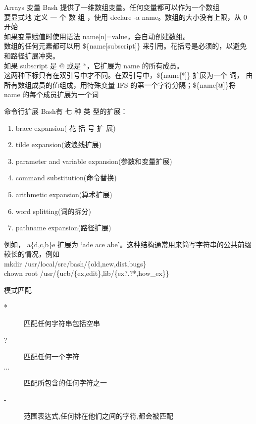 \begin{frame}{Arrays 变量}
Bash  提供了一维数组变量。任何变量都可以作为一个数组 \\
要显式地 定义 一 个 数 组 ，使用 declare -a name。数组的大小没有上限，从 0 开始\\
如果变量赋值时使用语法 name[n]=value，会自动创建数组。\\
数组的任何元素都可以用 \$\{name[subscript]\} 来引用。花括号是必须的，以避免和路径扩展冲突。\\
如果 subscript 是 @ 或是 *，它扩展为 name 的所有成员。\\
这两种下标只有在双引号中才不同。在双引号中，\$\{name[*]\} 扩展为一个 词， 由所有数组成员的值组成，用特殊变量 IFS 的第一个字符分隔；\$\{name[@]\}将 name 的每个成员扩展为一个词
\end{frame}

\begin{frame}{命令行扩展}
Bash有 七 种 类 型的扩展：
\begin{enumerate}
\item brace expansion( 花 括 号 扩 展)
\item  tilde expansion(波浪线扩展)
\item parameter and variable expansion(参数和变量扩展)
\item command substitution(命令替换)
\item arithmetic  expansion(算术扩展)
\item  word splitting(词的拆分)
\item pathname expansion(路径扩展)
\end{enumerate}
例如， a\{d,c,b\}e 扩展为 ‘ade ace abe’。这种结构通常用来简写字符串的公共前缀较长的情况，例如 \\
mkdir /usr/local/src/bash/\{old,new,dist,bugs\} \\
chown root /usr/\{ucb/\{ex,edit\},lib/\{ex?.?*,how\_ex\}\}
\end{frame}

\begin{frame}{模式匹配}
\begin{description}
\item [ * ] 匹配任何字符串包括空串
\item [ ? ] 匹配任何一个字符
\item [ $\cdots$] 匹配所包含的任何字符之一 
\item [ - ] 范围表达式,任何排在他们之间的字符,都会被匹配
\end{description}
\end{frame}

